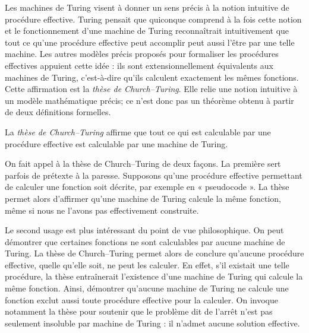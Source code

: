\documentclass[../../../include/open-logic-section]{subfiles}
\begin{document}

Les machines de Turing visent à donner un sens précis à la
notion intuitive de procédure effective. Turing pensait que
quiconque comprend à la fois cette notion et le fonctionnement
d'une machine de Turing reconnaîtrait intuitivement que tout
ce qu'une procédure effective peut accomplir peut aussi
l'être par une telle machine. Les autres modèles précis
proposés pour formaliser les procédures effectives appuient
cette idée : ils sont extensionnellement équivalents aux
machines de Turing, c'est-à-dire qu'ils calculent exactement
les mêmes fonctions. Cette affirmation est la
\emph{thèse de Church--Turing}. Elle relie une notion
intuitive à un modèle mathématique précis; ce n'est donc
pas un théorème obtenu à partir de deux définitions formelles.

\begin{defn}
La \emph{thèse de Church--Turing} affirme que tout ce
qui est calculable par une procédure effective est
calculable par une machine de Turing.
\end{defn}

On fait appel à la thèse de Church--Turing de deux façons.
La première sert parfois de prétexte à la paresse.
Supposons qu'une procédure effective permettant de calculer
une fonction soit décrite, par exemple en « pseudocode ».
La thèse permet alors d'affirmer qu'une machine de Turing
calcule la même fonction, même si nous ne l'avons pas
effectivement construite.

Le second usage est plus intéressant du point de vue
philosophique. On peut démontrer que certaines fonctions
ne sont calculables par aucune machine de Turing. La thèse
de Church--Turing permet alors de conclure qu'aucune
procédure effective, quelle qu'elle soit, ne peut les
calculer. En effet, s'il existait une telle procédure,
la thèse entraînerait l'existence d'une machine de Turing
qui calcule la même fonction. Ainsi, démontrer qu'aucune
machine de Turing ne calcule une fonction exclut aussi
toute procédure effective pour la calculer. On invoque
notamment la thèse pour soutenir que le problème dit
de l'arrêt n'est pas seulement insoluble par machine
de Turing : il n'admet aucune solution effective.
\end{document}
